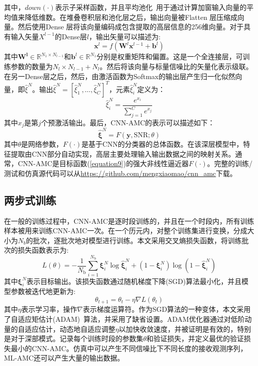 \documentclass[final]{cvpr}
\begin{document}
其中，$down(·)$表示子采样函数，并且平均池化~\cite{r36}用于通过计算加窗输入向量的平均值来降低维数。在堆叠卷积层和池化层之后，输出向量被Flatten 层压缩成向量。然后使用Dense 层将该向量编码成包含提取的高层信息的256维向量。对于具有输入矢量$X^{l−1}$的Dense层$l$，输出矢量可以描述为:
\begin{equation}
\mathbf{x}^{l}=f\left(\mathbf{W}^{l} \mathbf{x}^{l-1}+\mathbf{b}^{l}\right)\label{equation19}
\end{equation}
其中$\boldsymbol{W^l}\in \mathbb{R}^{N_1×N_{l−1}}$和$\boldsymbol{b}^l\in \mathbb{R}^{N_1}$分别是权重矩阵和偏置。这是一个全连接层，可训练参数的数量为$N_l\times N_{l−1}+N_l$。然后将该向量与标量信噪比的矢量化表示级联。
在另一Dense层之后，然后，由激活函数为Softmax的输出层产生归一化似然向量，即$\widehat{\xi}^N$。输出$\widehat{\xi}^N = [\widehat{\xi}^N_1,\dots,\widehat{\xi}^N_C]^T$，元素$\widehat{\xi}^N_i$定义为：
\begin{equation}
\hat{\xi}_{i}^{N}=\frac{e^{x_{i}}}{\sum_{j=1}^{C} e^{x_{j}}}\label{equation20}
\end{equation}
其中$x_j$是第$j$个预激活输出。最后，CNN-AMC的表示可以描述如下：
\begin{equation}
\hat{\boldsymbol{\xi}}^{N}=F(\mathbf{y}, \mathrm{SNR} ; \theta)\label{equation21}
\end{equation}
其中$\theta$是网络参数，$F(·)$是基于CNN的分类器的总体函数。在该深层模型中，特征提取由CNN部分自动实现，高层主要处理输入输出数据之间的映射关系。通常，CNN-AMC是目标函数(\ref{equation9})的强大非线性逼近器$F(·)$。完整的训练/测试和仿真源代码可以从\url{https://github.com/mengxiaomao/cnn_amc}下载。
\subsection{两步式训练}\label{Two-step}
在一般的训练过程中，CNN-AMC是逐时段训练的，并且在一个时段内，所有训练样本被用来训练CNN-AMC一次。在一个历元内，对整个训练集进行变换，分成大小为$N_b$的批次，逐批次地对模型进行训练。本文采用交叉熵损失函数，将训练批次的损失函数表示为:
\begin{equation}
L(\theta)=-\frac{1}{N_{\mathrm{b}}} \sum_{i=1}^{N_{\mathrm{b}}} \boldsymbol{\xi}_{i}^{N} \log \hat{\boldsymbol{\xi}}_{i}^{N}+\left(1-\boldsymbol{\xi}_{i}^{N}\right) \log \left(1-\hat{\boldsymbol{\xi}}_{i}^{N}\right)\label{equation22}
\end{equation}
其中$\boldsymbol{\xi}_{i}^{N}$表示目标输出。该损失函数通过随机梯度下降(SGD)算法最小化，并且模型参数被迭代地更新为:
\begin{equation}
\theta_{t+1}=\theta_{t}-\eta \nabla L\left(\theta_{t}\right)\label{equation23}
\end{equation}
其中$\eta$表示学习率，操作$\nabla$表示梯度运算符。作为SGD算法的一种变体，本文采用了自适应矩估计(ADAM)~\cite{r37}算法，并采用了缺省设置。ADAM优化器通过对低阶动量的自适应估计，动态地自适应调整$\eta$以加快收敛速度，并被证明是有效的，特别是对于深部模式。记录每个训练时段的参数集$\theta$和验证损失，并定义最优的验证损失最小的CNN-AMC。仿真中可以产生不同信噪比下不同长度的接收观测序列，ML-AMC还可以产生大量的输出数据。
\end{document}
